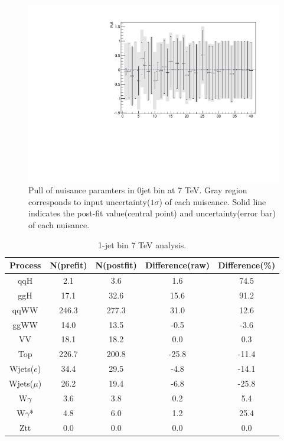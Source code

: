 \begin{figure}[!hbtp]
\centering 
\includegraphics[width=.75\textwidth]{figures/postnuisance_0j_7tev.pdf}
\caption{Pull of nuisance paramters in 0jet bin at 7 TeV.
Gray region corresponds to input uncertainty($1\sigma$) of each nuiscance.
Solid line indicates the post-fit value(central point) and uncertainty(error bar)
of each nuisance.}
\label{fig:nuisance_0j_7tev}
\end{figure} 
\clearpage 

\begin{table}[ht!]
\begin{center}
\begin{tabular}{c|cc|cc}
\hline \hline
Process     &    N(prefit) &   N(postfit) & Difference(raw) &  Difference(\%)  \\  
\hline \hline
qqH         &        2.1 &        3.6 &        1.6 &       74.5        \\
ggH         &       17.1 &       32.6 &       15.6 &       91.2        \\
\hline
qqWW        &      246.3 &      277.3 &       31.0 &       12.6        \\
ggWW        &       14.0 &       13.5 &       -0.5 &       -3.6        \\
\hline
VV          &       18.1 &       18.2 &        0.0 &        0.3        \\
\hline
Top         &      226.7 &      200.8 &      -25.8 &      -11.4        \\
\hline
Wjets($e$)  &       34.4 &       29.5 &       -4.8 &      -14.1        \\
Wjets($\mu$) &       26.2 &       19.4 &       -6.8 &      -25.8        \\
\hline
W$\gamma$   &        3.6 &        3.8 &        0.2 &        5.4        \\
W$\gamma$*  &        4.8 &        6.0 &        1.2 &       25.4        \\
\hline
Ztt         &        0.0 &        0.0 &        0.0 &        0.0        \\
\hline \hline
\end{tabular}
\caption{1-jet bin 7 TeV analysis.}
\label{tab:postnorm_1j_7tev}
\end{center}
\end{table}

